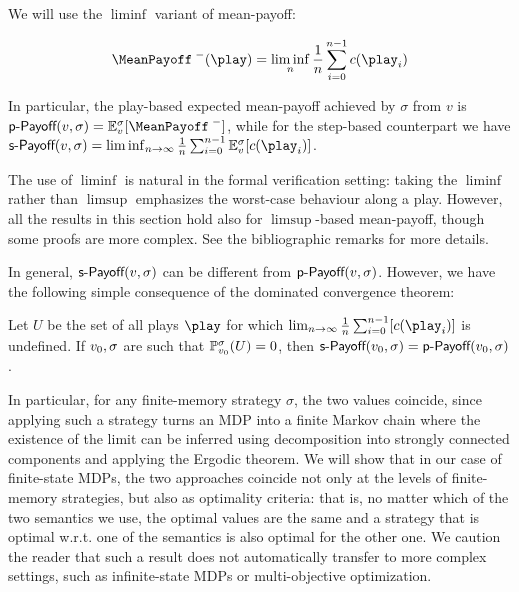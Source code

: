 We will use the $\liminf$ variant of mean-payoff:

\[
\MeanPayoffInf(\play) = \liminf_n \frac{1}{n} \sum_{i = 0}^{n-1} c(\play_i)
\]

In particular, the play-based expected mean-payoff achieved by $ \sigma $ from $ v $ is $ \playPay(v, \sigma) = \expv_v^\sigma[\MeanPayoffInf] $, while for the step-based counterpart we have $ \stepPay(v, \sigma) = \liminf_{n \rightarrow \infty} \frac{1}{n} \sum_{i=0}^{n-1} \expv_v^\sigma[\colouring(\play_i)]$.

The use of $ \liminf $ is natural in the formal verification setting: taking the $\liminf$ rather than $ \limsup $ emphasizes the worst-case behaviour along a play. However, all the results in this section hold also for $\limsup$-based mean-payoff, though some proofs are more complex. See the bibliographic remarks for more details.
%

In general, $\textsf{s-Payoff}(v,\sigma)$ can be different from $ \textsf{p-Payoff}(v, \sigma) $. However, we have the following simple consequence of the dominated convergence theorem:
\begin{lemma}
	\label{5-lem:limit-defined}
Let $U$ be the set of all plays $\play$  for which $\lim_{n\rightarrow \infty} \frac{1}{n} \sum_{i=0}^{n-1}[\colouring(\play_i)]$ is undefined. If $v_0,\sigma$ are such that $\mathbb{P}^\sigma_{v_0}(U) = 0$, then $\textsf{s-Payoff}(v_0,\sigma) = \textsf{p-Payoff}(v_0, \sigma) $.
\end{lemma}


In particular, for any finite-memory strategy $ \sigma $, the two values coincide, since applying such a strategy turns an MDP into a finite Markov chain where the existence of the limit can be inferred using decomposition into strongly connected components and applying the Ergodic theorem.
We will show that in our case of finite-state MDPs, the two approaches coincide not only at the levels of finite-memory strategies, but also as optimality criteria: that is, no matter which of the two semantics we use, the optimal values are the same and a strategy that is optimal w.r.t. one of the semantics is also optimal for the other one. We caution the reader that such a result does not automatically transfer to more complex settings, such as infinite-state MDPs or multi-objective optimization. 

